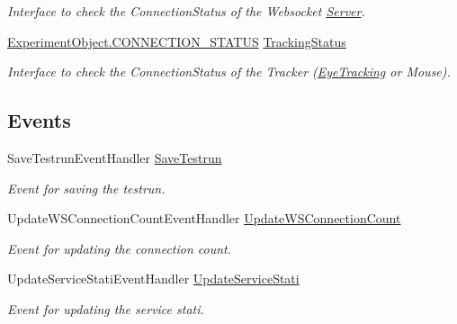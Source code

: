 \begin{DoxyCompactItemize}
\begin{DoxyCompactList}\small\item\em Interface to check the Connection\+Status of the Websocket \hyperlink{namespace_web_analyzer_1_1_server}{Server}. \end{DoxyCompactList}\item 
\hyperlink{class_web_analyzer_1_1_u_i_1_1_interaction_objects_1_1_experiment_object_a2875208b4f4b0ed643593152f4ec025c}{Experiment\+Object.\+C\+O\+N\+N\+E\+C\+T\+I\+O\+N\+\_\+\+S\+T\+A\+T\+U\+S} \hyperlink{class_web_analyzer_1_1_controller_1_1_test_controller_adc0db19e3cc5958f24dd5fd09ce34d98}{Tracking\+Status}
\begin{DoxyCompactList}\small\item\em Interface to check the Connection\+Status of the Tracker (\hyperlink{namespace_web_analyzer_1_1_eye_tracking}{Eye\+Tracking} or Mouse). \end{DoxyCompactList}\end{DoxyCompactItemize}
\subsection*{Events}
\begin{DoxyCompactItemize}
\item 
Save\+Testrun\+Event\+Handler \hyperlink{class_web_analyzer_1_1_controller_1_1_test_controller_a45f8340dcea78391a3f58e5c7996d126}{Save\+Testrun}
\begin{DoxyCompactList}\small\item\em Event for saving the testrun. \end{DoxyCompactList}\item 
Update\+W\+S\+Connection\+Count\+Event\+Handler \hyperlink{class_web_analyzer_1_1_controller_1_1_test_controller_a3b6d28efa43ed99a2bdf0db062ba46e1}{Update\+W\+S\+Connection\+Count}
\begin{DoxyCompactList}\small\item\em Event for updating the connection count. \end{DoxyCompactList}\item 
Update\+Service\+Stati\+Event\+Handler \hyperlink{class_web_analyzer_1_1_controller_1_1_test_controller_aaf41a1a9569092d3c41a17a914607a7c}{Update\+Service\+Stati}
\begin{DoxyCompactList}\small\item\em Event for updating the service stati. \end{DoxyCompactList}\end{DoxyCompactItemize}
